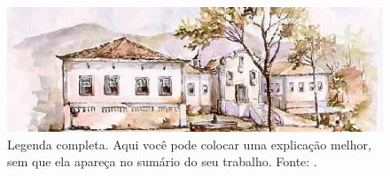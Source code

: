 \lipsum[30]

\begin{figure}[!htbp]
	\centering
	\includegraphics[scale=0.4]{figuras/ichs2.jpg} %
	\caption[Legenda reduzida - aparece no sumario]{Legenda completa. Aqui você pode colocar uma explicação melhor, sem que ela apareça no sumário do seu trabalho. Fonte: \cite[p.~117]{boyle1772}.} 
	\label{fig:309} 
\end{figure}